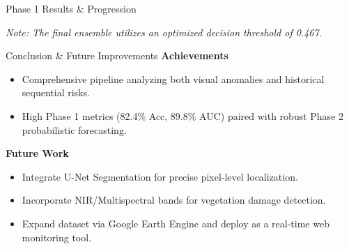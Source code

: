 \documentclass[11pt]{beamer}
\begin{document}
\begin{frame}{Phase 1 Results \& Progression}
    \begin{table}[]
        \centering
    \end{table}
    \vspace{0.3cm}
    \textit{Note: The final ensemble utilizes an optimized decision threshold of 0.467.}
\end{frame}

\begin{frame}{Conclusion \& Future Improvements}
    \textbf{Achievements}
    \begin{itemize}
        \item Comprehensive pipeline analyzing both visual anomalies and historical sequential risks.
        \item High Phase 1 metrics (82.4\% Acc, 89.8\% AUC) paired with robust Phase 2 probabilistic forecasting.
    \end{itemize}
    \vspace{0.3cm}
    \textbf{Future Work}
    \begin{itemize}
        \item Integrate U-Net Segmentation for precise pixel-level localization.
        \item Incorporate NIR/Multispectral bands for vegetation damage detection.
        \item Expand dataset via Google Earth Engine and deploy as a real-time web monitoring tool.
    \end{itemize}
\end{frame}
\end{document}
